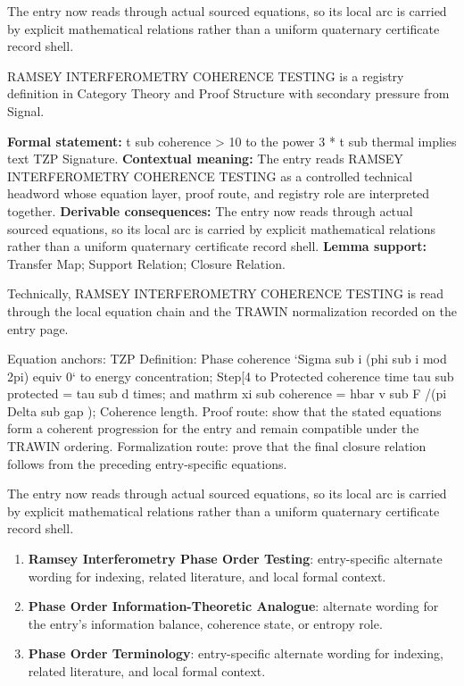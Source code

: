 The entry now reads through actual sourced equations, so its local arc is carried by explicit mathematical relations rather than a uniform quaternary certificate record shell.
\clearpage


\begingroup\small
{}
RAMSEY INTERFEROMETRY COHERENCE TESTING is a registry definition in Category Theory and Proof Structure with secondary pressure from Signal.

\begingroup\footnotesize\setlength{\emergencystretch}{3em}\sloppy
\textbf{Formal statement:} t sub coherence > 10 to the power 3 * t sub thermal implies text TZP Signature. \textbf{Contextual meaning:} The entry reads RAMSEY INTERFEROMETRY COHERENCE TESTING as a controlled technical headword whose equation layer, proof route, and registry role are interpreted together. \textbf{Derivable consequences:} The entry now reads through actual sourced equations, so its local arc is carried by explicit mathematical relations rather than a uniform quaternary certificate record shell. \textbf{Lemma support:} Transfer Map; Support Relation; Closure Relation.\par
\endgroup

Technically, RAMSEY INTERFEROMETRY COHERENCE TESTING is read through the local equation chain and the TRAWIN normalization recorded on the entry page.

Equation anchors: TZP Definition: Phase coherence `Sigma sub i (phi sub i mod 2pi) equiv 0` to energy concentration; Step[4 to Protected coherence time tau sub protected = tau sub d times; and mathrm xi sub coherence = hbar v sub F /(pi Delta sub gap ); Coherence length. Proof route: show that the stated equations form a coherent progression for the entry and remain compatible under the TRAWIN ordering. Formalization route: prove that the final closure relation follows from the preceding entry-specific equations.

The entry now reads through actual sourced equations, so its local arc is carried by explicit mathematical relations rather than a uniform quaternary certificate record shell.
\endgroup

\begin{enumerate}[leftmargin=1.6em,itemsep=6pt,topsep=4pt]
\item \textbf{Ramsey Interferometry Phase Order Testing}: entry-specific alternate wording for indexing, related literature, and local formal context.
\item \textbf{Phase Order Information-Theoretic Analogue}: alternate wording for the entry's information balance, coherence state, or entropy role.
\item \textbf{Phase Order Terminology}: entry-specific alternate wording for indexing, related literature, and local formal context.
\end{enumerate}

